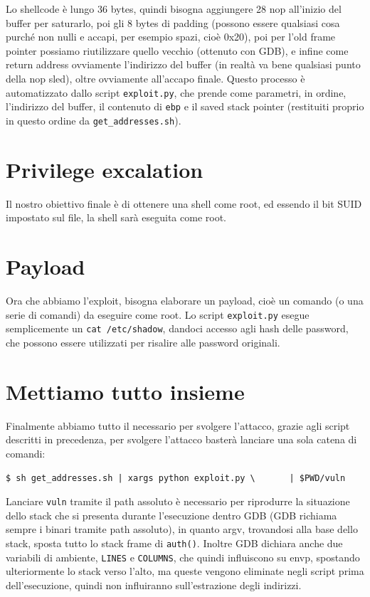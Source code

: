 \documentclass[a4paper,12pt]{report}
\begin{document}
	Lo shellcode è lungo 36 bytes, quindi bisogna aggiungere 28 nop all'inizio del buffer per saturarlo, poi gli 8 bytes di padding (possono essere qualsiasi cosa purché non nulli e accapi, per esempio spazi, cioè 0x20), poi per l'old frame pointer possiamo riutilizzare quello vecchio (ottenuto con GDB), e infine come return address ovviamente l'indirizzo del buffer (in realtà va bene qualsiasi punto della nop sled), oltre ovviamente all'accapo finale. Questo processo è automatizzato dallo script \texttt{exploit.py}, che prende come parametri, in ordine, l'indirizzo del buffer, il contenuto di \texttt{ebp} e il saved stack pointer (restituiti proprio in questo ordine da \texttt{get\_addresses.sh}). \\

	\vspace{24pt}
\section*{Privilege excalation}
Il nostro obiettivo finale è di ottenere una shell come root, ed essendo il bit SUID impostato sul file, la shell sarà eseguita come root. \\

\vspace{24pt}
\section*{Payload}

	Ora che abbiamo l'exploit, bisogna elaborare un payload, cioè un comando (o una serie di comandi) da eseguire come root. Lo script \texttt{exploit.py} esegue semplicemente un \texttt{cat /etc/shadow}, dandoci accesso agli hash delle password, che possono essere utilizzati per risalire alle password originali. \\

\vspace{24pt}
\section*{Mettiamo tutto insieme}
	Finalmente abbiamo tutto il necessario per svolgere l'attacco, grazie agli script descritti in precedenza, per svolgere l'attacco basterà lanciare una sola catena di comandi:
	\begin{commandbox}
		\verb#$ sh get_addresses.sh | xargs python exploit.py \ # \newline
		\verb#     | $PWD/vuln#
	\end{commandbox}
	Lanciare \texttt{vuln} tramite il path assoluto è necessario per riprodurre la situazione dello stack che si presenta durante l'esecuzione dentro GDB (GDB richiama sempre i binari tramite path assoluto), in quanto argv, trovandosi alla base dello stack, sposta tutto lo stack frame di \texttt{auth()}. Inoltre GDB dichiara anche due variabili di ambiente, \texttt{LINES} e \texttt{COLUMNS}, che quindi influiscono su envp, spostando ulteriormente lo stack verso l'alto, ma queste vengono eliminate negli script prima dell'esecuzione, quindi non influiranno sull'estrazione degli indirizzi. \\
\end{document}
